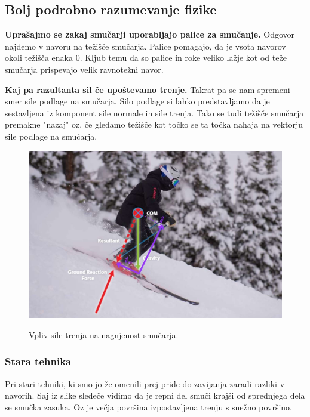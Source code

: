 \documentclass{article}
\begin{document}
\subsection{Bolj podrobno razumevanje fizike}
\textbf{Uprašajmo se zakaj smučarji uporabljajo palice za smučanje.} Odgovor najdemo v navoru na težišče smučarja.
Palice pomagajo, da je vsota navorov okoli težišča enaka 0. Kljub temu da so palice in roke veliko lažje kot
od teže smučarja prispevajo velik ravnotežni navor. \\ \newline

\textbf{Kaj pa razultanta sil če upoštevamo trenje.} Takrat pa se nam spremeni smer sile podlage na smučarja.
Silo podlage si lahko predstavljamo da je sestavljena iz komponent sile normale in sile trenja. 
Tako se tudi težišče smučarja premakne "nazaj" oz. če gledamo težišče kot točko se ta točka nahaja na vektorju
sile podlage na smučarja. \\ \newline

\begin{figure}
    \centering
    \includegraphics[scale=0.18]{../images/Sile pri com.jpg} \\
    \caption[short]{Vpliv sile trenja na nagnjenost smučarja.}
\end{figure}

\subsubsection*{Stara tehnika}
Pri stari tehniki, ki smo jo že omenili prej pride do zavijanja zaradi razliki v navorih. Saj iz slike sledeče vidimo
da je repni del smuči krajši od sprednjega dela se smučka zasuka. Oz je večja površina izpostavljena trenju s snežno površino.
\end{document}
